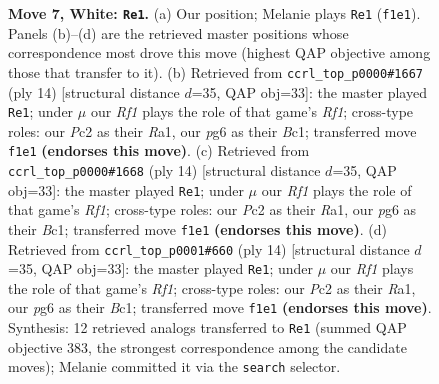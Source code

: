 \documentclass[11pt]{article}
\begin{document}
\begin{figure}[p]
\caption{\textbf{Move 7, White: \texttt{Re1}.} (a) Our position; Melanie plays \texttt{Re1} (\texttt{f1e1}). Panels (b)--(d) are the retrieved master positions whose correspondence most drove this move (highest QAP objective among those that transfer to it). (b) Retrieved from \texttt{ccrl\_top\_p0000\#1667} (ply 14) [structural distance $d$=35, QAP obj=33]: the master played \texttt{Re1}; under $\mu$ our \emph{Rf1} plays the role of that game's \emph{Rf1}; cross-type roles: our \emph{P}c2 as their \emph{R}a1, our \emph{p}g6 as their \emph{B}c1; transferred move \texttt{f1e1} \textbf{(endorses this move)}. (c) Retrieved from \texttt{ccrl\_top\_p0000\#1668} (ply 14) [structural distance $d$=35, QAP obj=33]: the master played \texttt{Re1}; under $\mu$ our \emph{Rf1} plays the role of that game's \emph{Rf1}; cross-type roles: our \emph{P}c2 as their \emph{R}a1, our \emph{p}g6 as their \emph{B}c1; transferred move \texttt{f1e1} \textbf{(endorses this move)}. (d) Retrieved from \texttt{ccrl\_top\_p0001\#660} (ply 14) [structural distance $d$=35, QAP obj=33]: the master played \texttt{Re1}; under $\mu$ our \emph{Rf1} plays the role of that game's \emph{Rf1}; cross-type roles: our \emph{P}c2 as their \emph{R}a1, our \emph{p}g6 as their \emph{B}c1; transferred move \texttt{f1e1} \textbf{(endorses this move)}. Synthesis: 12 retrieved analogs transferred to \texttt{Re1} (summed QAP objective 383, the strongest correspondence among the candidate moves); Melanie committed it via the \texttt{search} selector.}
\label{fig:thought-m12}
\end{figure}

\clearpage
\end{document}
